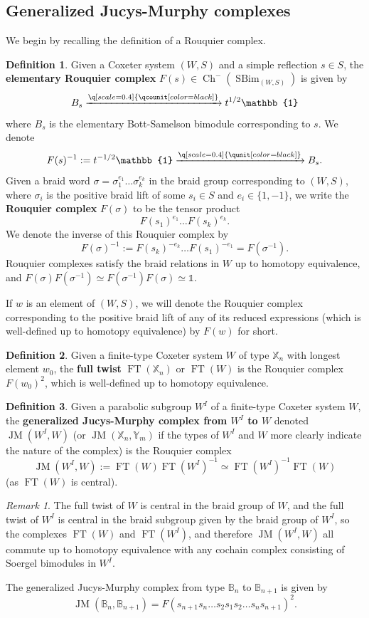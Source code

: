 \documentclass[11pt]{article}
\DeclareMathOperator{\Ch}{Ch}
\DeclareMathOperator{\SBim}{SBim}
\DeclareMathOperator{\JM}{JM}
\DeclareMathOperator{\FT}{FT}
\theoremstyle{definition}
\newtheorem{definition}{Definition}[section]
\theoremstyle{remark}
\newtheorem*{remark}{Remark}
\numberwithin{equation}{section}
\begin{document}
\subsection{Generalized Jucys-Murphy complexes}
We begin by recalling the definition of a Rouquier complex.
\begin{definition}
Given a Coxeter system $(W,S)$ and a simple reflection $s\in S$, the
\textbf{elementary Rouquier complex} $F(s)\in
\Ch^-(\SBim_{(W,S)})$ is given by
\[B_s \xrightarrow{\q[scale=0.4]{\qcounit[color=black]}} t^{1/2}\mathbb{1}\]
where $B_{s}$ is the elementary Bott-Samelson bimodule corresponding to
$s$. We denote
\[F(s)^{-1}:=t^{-1/2}\mathbb{1} 
\xrightarrow{\q[scale=0.4]{\qunit[color=black]}} B_{s}.\]
Given a braid word $\sigma=\sigma_{1}^{e_1}\dots \sigma_k^{e_k}$ in the
braid group corresponding to $(W,S)$, where $\sigma_i$ is the
positive braid lift of some $s_i\in S$ and $e_i \in \{1,-1\}$, we write
the \textbf{Rouquier complex} $F(\sigma)$ to be the tensor product
\[F(s_1)^{e_1}\dots F(s_k)^{e_k}.\]
We denote the inverse of this Rouquier complex by
\[F(\sigma)^{-1}:=F(s_k)^{-e_k}\dots F(s_1)^{-e_1}=F(\sigma^{-1}).\]
Rouquier complexes satisfy the braid relations in $W$ up to homotopy equivalence,
and $F(\sigma)F(\sigma^{-1})\simeq F(\sigma^{-1})F(\sigma)\simeq \mathbb{1}$.
\end{definition}
\noindent If $w$ is an element of $(W,S)$, we will denote the Rouquier
complex corresponding to the positive braid lift of any of its reduced expressions
(which is well-defined up to homotopy equivalence) by $F(w)$ for short.
\begin{definition}
Given a finite-type Coxeter system $W$ of type
$\mathbb{X}_n$ with longest element $w_0$, the
\textbf{full twist} $\FT(\mathbb{X}_n)$ or $\FT(W)$ is the Rouquier complex
$F(w_0)^2$, which is well-defined up to homotopy equivalence.
\end{definition}
\begin{definition}
\noindent Given a parabolic subgroup $W^I$ of a finite-type
Coxeter system $W$, the
\textbf{generalized Jucys-Murphy complex from $W^I$ to $W$} denoted
$\JM(W^I,W)$ (or $\JM(\mathbb{X}_n,\mathbb{Y}_m)$ if the types of $W^I$ and $W$ more
clearly indicate the nature of the complex) is the Rouquier complex
\[\JM(W^I,W):=
\FT(W)\FT(W^I)^{-1}\simeq \FT(W^I)^{-1}\FT(W)\] (as $\FT(W)$ is central).
\end{definition}
\begin{remark}
The full twist of $W$ is central in the braid group of $W$, and
the full twist of
$W^I$ is central in the braid subgroup given by the braid group of
$W^I$, so the complexes $\FT(W)$ and $\FT(W^I)$, and therefore
$\JM(W^I,W)$ all commute up to homotopy equivalence with any cochain
complex consisting of Soergel bimodules in $W^I$.
\end{remark}
\noindent The generalized Jucys-Murphy complex from type
$\mathbb{B}_n$ to $\mathbb{B}_{n+1}$ is given
by 
\begin{equation}\label{eqn:typebjm}\JM(\mathbb{B}_n, \mathbb{B}_{n+1})=
	F(s_{n+1}s_{n}\dots s_{2}s_1s_2
\dots s_{n}s_{n+1})^2.\end{equation}
\end{document}
